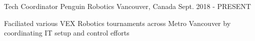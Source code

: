 

\begin{cventries}

  \cventry
    {Tech Coordinator} %
    {Penguin Robotics} %
    {Vancouver, Canada} %
    {Sept. 2018 - PRESENT} %
    {
      \begin{cvitems} %
        \item {Faciliated various VEX Robotics tournaments across Metro Vancouver by coordinating IT setup and control efforts}
      \end{cvitems}
    }

\end{cventries}
